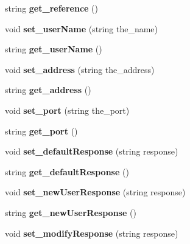\begin{DoxyCompactItemize}
string {\bfseries get\+\_\+reference} ()
\item 
\mbox{\label{class_bridge_a6b34d672f46d2bb2f9bc43d79618eec7}} 
void {\bfseries set\+\_\+user\+Name} (string the\+\_\+name)
\item 
\mbox{\label{class_bridge_a7e92805149031acb4f470957de2622da}} 
string {\bfseries get\+\_\+user\+Name} ()
\item 
\mbox{\label{class_bridge_a363f5dff05e0b7c7545c61dbd3dc9d66}} 
void {\bfseries set\+\_\+address} (string the\+\_\+address)
\item 
\mbox{\label{class_bridge_ac2927ee5c443aec94d12fa318b8b259f}} 
string {\bfseries get\+\_\+address} ()
\item 
\mbox{\label{class_bridge_afafbafb003d63e36a43d237b184dbd2a}} 
void {\bfseries set\+\_\+port} (string the\+\_\+port)
\item 
\mbox{\label{class_bridge_a48c953016b085bc9c2071ce48bf38a54}} 
string {\bfseries get\+\_\+port} ()
\item 
\mbox{\label{class_bridge_a18ace55fb18a74458da6e29c06a9920b}} 
void {\bfseries set\+\_\+default\+Response} (string response)
\item 
\mbox{\label{class_bridge_aff5c24c0793bee3277764085d26b4b05}} 
string {\bfseries get\+\_\+default\+Response} ()
\item 
\mbox{\label{class_bridge_a04e4df5d6d5f5a67a24a141bd4eba69f}} 
void {\bfseries set\+\_\+new\+User\+Response} (string response)
\item 
\mbox{\label{class_bridge_a3903f77bc9e2f91aa0bdde4d176648f3}} 
string {\bfseries get\+\_\+new\+User\+Response} ()
\item 
\mbox{\label{class_bridge_ab2a198dffad232ed114b76974fc5dab8}} 
void {\bfseries set\+\_\+modify\+Response} (string response)
\item 
\mbox{\label{class_bridge_a7585fb161fa8beb13cd799dab7219e9d}} 

\end{DoxyCompactItemize}
